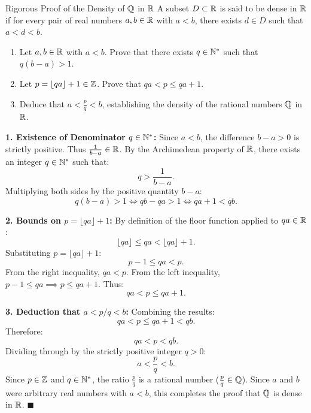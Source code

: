 \begin{exercise}{Rigorous Proof of the Density of $\mathbb{Q}$ in $\mathbb{R}$}
A subset $D \subset \mathbb{R}$ is said to be dense in $\mathbb{R}$ if for every pair of real numbers $a, b \in \mathbb{R}$ with $a < b$, there exists $d \in D$ such that $a < d < b$.
\begin{enumerate}[leftmargin=1.5em,itemsep=2pt]
  \item Let $a, b \in \mathbb{R}$ with $a < b$. Prove that there exists $q \in \mathbb{N}^*$ such that $q(b - a) > 1$.
  \item Let $p = \lfloor qa \rfloor + 1 \in \mathbb{Z}$. Prove that $qa < p \le qa + 1$.
  \item Deduce that $a < \frac{p}{q} < b$, establishing the density of the rational numbers $\mathbb{Q}$ in $\mathbb{R}$.
\end{enumerate}
\end{exercise}

\begin{tabletworkspace}[5.0cm]
\end{tabletworkspace}

\begin{solution}
\textbf{1. Existence of Denominator $q \in \mathbb{N}^*$:}
Since $a < b$, the difference $b - a > 0$ is strictly positive.
Thus $\frac{1}{b - a} \in \mathbb{R}$.
By the Archimedean property of $\mathbb{R}$, there exists an integer $q \in \mathbb{N}^*$ such that:
\[
q > \frac{1}{b - a}.
\]
Multiplying both sides by the positive quantity $b - a$:
\[
q(b - a) > 1 \iff qb - qa > 1 \iff qa + 1 < qb.
\]

\textbf{2. Bounds on $p = \lfloor qa \rfloor + 1$:}
By definition of the floor function applied to $qa \in \mathbb{R}$:
\[
\lfloor qa \rfloor \le qa < \lfloor qa \rfloor + 1.
\]
Substituting $p = \lfloor qa \rfloor + 1$:
\[
p - 1 \le qa < p.
\]
From the right inequality, $qa < p$.
From the left inequality, $p - 1 \le qa \implies p \le qa + 1$.
Thus:
\[
qa < p \le qa + 1.
\]

\textbf{3. Deduction that $a < p/q < b$:}
Combining the results:
\[
qa < p \le qa + 1 < qb.
\]
Therefore:
\[
qa < p < qb.
\]
Dividing through by the strictly positive integer $q > 0$:
\[
a < \frac{p}{q} < b.
\]
Since $p \in \mathbb{Z}$ and $q \in \mathbb{N}^*$, the ratio $\frac{p}{q}$ is a rational number ($\frac{p}{q} \in \mathbb{Q}$).
Since $a$ and $b$ were arbitrary real numbers with $a < b$, this completes the proof that $\mathbb{Q}$ is dense in $\mathbb{R}$. \hfill $\blacksquare$
\end{solution}

